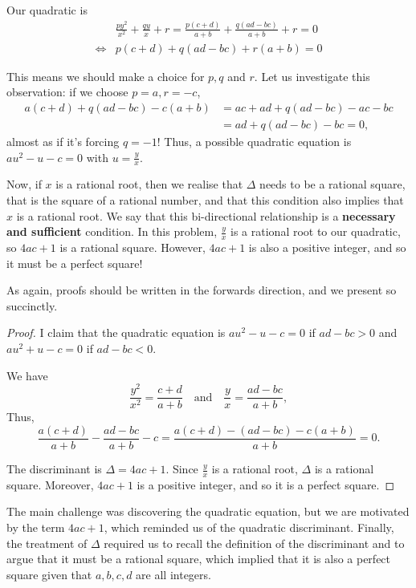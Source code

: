 \documentclass[../main.tex]{subfiles}
\begin{document}
Our quadratic is
\begin{align*}
   &\frac{py^2}{x^2}+\frac{qy}{x}+r=\frac{p(c+d)}{a+b}+\frac{q(ad-bc)}{a+b}+r=0 \\
   \Longleftrightarrow &p(c+d)+q(ad-bc)+r(a+b)=0
\end{align*}

This means we should make a choice for $p, q$ and $r$. Let us investigate this observation: if we choose $p=a, r=-c$,
\begin{align*}
    a(c+d)+q(ad-bc)-c(a+b)&=ac+ad+q(ad-bc)-ac-bc\\
    &=ad+q(ad-bc)-bc=0,
\end{align*}
almost as if it's forcing $q=-1$!
Thus, a possible quadratic equation is $au^2-u-c=0$ with $u=\frac{y}{x}$.

Now, if $x$ is a rational root, then we realise that $\Delta$ needs to be a rational square, that is the square of a rational number, and that this condition also implies that $x$ is a rational root. We say that this bi-directional relationship is a \textbf{necessary and sufficient} condition. In this problem, $\frac{y}{x}$ is a rational root to our quadratic, so $4ac+1$ is a rational square. However, $4ac+1$ is also a positive integer, and so it must be a perfect square!

As again, proofs should be written in the forwards direction, and we present so succinctly.
\begin{proof}
I claim that the quadratic equation is $au^2-u-c=0$ if $ad-bc > 0$ and $au^2+u-c=0$ if $ad-bc < 0$.

We have $$\frac{y^2}{x^2}=\frac{c+d}{a+b} \quad\text{and}\quad \frac{y}{x}=\frac{ad-bc}{a+b},$$
Thus, $$\frac{a(c+d)}{a+b}-\frac{ad-bc}{a+b}-c=\frac{a(c+d)-(ad-bc)-c(a+b)}{a+b}=0.$$

The discriminant is $\Delta=4ac+1$. Since $\frac{y}{x}$ is a rational root, $\Delta$ is a rational square. Moreover, $4ac+1$ is a positive integer, and so it is a perfect square.
\end{proof}
\begin{moral}
The main challenge was discovering the quadratic equation, but we are motivated by the term $4ac+1$, which reminded us of the quadratic discriminant. Finally, the treatment of $\Delta$ required us to recall the definition of the discriminant and to argue that it must be a rational square, which implied that it is also a perfect square given that $a,b,c,d$ are all integers.
\end{moral}
\end{document}
